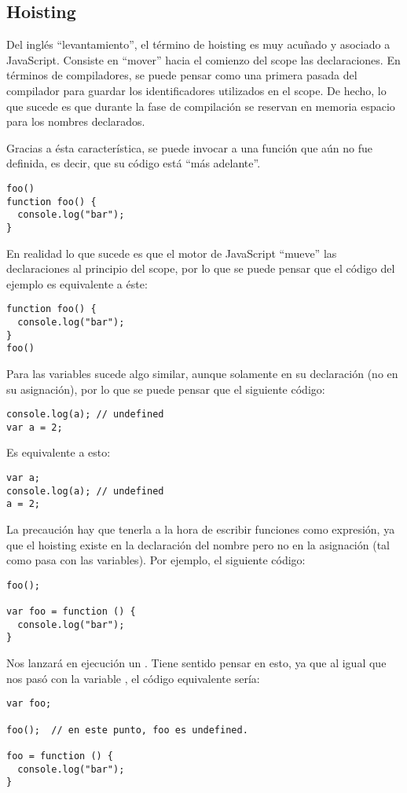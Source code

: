 
\subsection{Hoisting}
\label{sec:hoisting}

Del inglés "`levantamiento"', el término de hoisting es muy acuñado y asociado a JavaScript. Consiste en "`mover"' hacia el comienzo del scope las declaraciones. En términos de compiladores, se puede pensar como una primera pasada del compilador para guardar los identificadores utilizados en el scope. De hecho, lo que sucede es que durante la fase de compilación se reservan en memoria espacio para los nombres declarados.

Gracias a ésta característica, se puede invocar a una función que aún no fue definida, es decir, que su código está "`más adelante"'.

\begin{lstlisting}
foo()
function foo() {
  console.log("bar");
}
\end{lstlisting}

En realidad lo que sucede es que el motor de JavaScript "`mueve"' las declaraciones al principio del scope, por lo que se puede pensar que el código del ejemplo es equivalente a éste:

\begin{lstlisting}
function foo() {
  console.log("bar");
}
foo()
\end{lstlisting}

Para las variables sucede algo similar, aunque solamente en su declaración (no en su asignación), por lo que se puede pensar que el siguiente código:

\begin{lstlisting}
console.log(a); // undefined
var a = 2;
\end{lstlisting}

Es equivalente a esto:

\begin{lstlisting}
var a;
console.log(a);	// undefined
a = 2;
\end{lstlisting}

La precaución hay que tenerla a la hora de escribir funciones como expresión, ya que el hoisting existe en la declaración del nombre pero no en la asignación (tal como pasa con las variables). Por ejemplo, el siguiente código:

\begin{lstlisting}
foo();

var foo = function () { 
  console.log("bar");
}
\end{lstlisting}

Nos lanzará en ejecución un . Tiene sentido pensar en esto, ya que al igual que nos pasó con la variable , el código equivalente sería:

\begin{lstlisting}
var foo;

foo();	// en este punto, foo es undefined.

foo = function () { 
  console.log("bar");
}
\end{lstlisting}